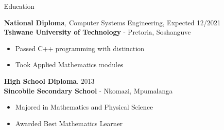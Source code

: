 \documentclass{resume} %
\newcommand{\sepspace}{\vspace*{1em}}           %
\begin{document}
\begin{rSection}{Education}

        \textbf{National Diploma}, Computer Systems Engineering, Expected 12/2021 \\
        \textbf{Tshwane University of Technology} - Pretoria, Soshanguve
        \begin{itemize}[noitemsep,topsep=-6pt]
          \item Passed C++ programming with distinction
          \item Took Applied Mathematics modules
        \end{itemize}

        \sepspace

        \textbf{High School Diploma}, 2013\\
        \textbf{Sincobile Secondary School} - Nkomazi, Mpumalanga
        \begin{itemize}[noitemsep,topsep=-6pt]
          \item Majored in Mathematics and Physical Science
          \item Awarded Best Mathematics Learner
        \end{itemize}

    
    
\end{rSection}
\end{document}

